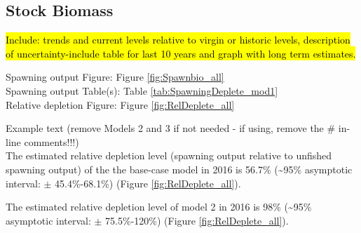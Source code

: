 \documentclass[12pt,]{article}
\begin{document}
\FloatBarrier

\subsection*{Stock Biomass}\label{stock-biomass}

\hl{Include: trends and current levels relative to virgin or historic levels, 
description of uncertainty-include table for last 10 years and graph with 
long term estimates.}

Spawning output Figure: Figure \ref{fig:Spawnbio_all}\\
Spawning output Table(s): Table \ref{tab:SpawningDeplete_mod1}\\
Relative depletion Figure: Figure \ref{fig:RelDeplete_all}

Example text (remove Models 2 and 3 if not needed - if using, remove the
\# in-line comments!!!)\\
The estimated relative depletion level (spawning output relative to
unfished spawning output) of the the base-case model in 2016 is 56.7\%
(\textasciitilde{}95\% asymptotic interval: \(\pm\) 45.4\%-68.1\%)
(Figure \ref{fig:RelDeplete_all}).

The estimated relative depletion level of model 2 in 2016 is 98\%
(\textasciitilde{}95\% asymptotic interval: \(\pm\) 75.5\%-120\%)
(Figure \ref{fig:RelDeplete_all}).

\FloatBarrier
\end{document}
